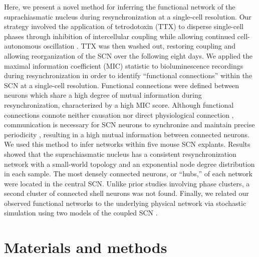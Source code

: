 Here, we present a novel method for inferring the functional network of the suprachiasmatic nucleus during resynchronization at a single-cell resolution.
Our strategy involved the application of tetrodotoxin (TTX) to disperse single-cell phases through inhibition of intercellular coupling while allowing continued cell-autonomous oscillation \cite{Yamaguchi2003, Schwartz1987}. 
TTX was then washed out, restoring coupling and allowing reorganization of the SCN over the following eight days.  
We applied the maximal information coefficient (MIC) statistic \cite{Reshef2011} to bioluminescence recordings during resynchronization in order to identify ``functional connections'' within the SCN at a single-cell resolution.
Functional connections were defined between neurons which share a high degree of mutual information during resynchronization, characterized by a high MIC score.
Although functional connections connote neither causation nor direct physiological connection \cite{Eguiluz2005}, communication is necessary for SCN neurons to synchronize and maintain precise periodicity \cite{Herzog2004a}, resulting in a high mutual information between connected neurons.
We used this method to infer networks within five mouse SCN explants. 
Results showed that the suprachiasmatic nucleus has a consistent resynchronization network with a small-world topology and an exponential node degree distribution in each sample. 
The most densely connected neurons, or ``hubs,'' of each network were located in the central SCN.
Unlike prior studies involving phase clusters, a second cluster of connected shell neurons was not found.
Finally, we related our observed functional networks to the underlying physical network via stochastic simulation using two models of the coupled SCN \cite{Gonze2006,Schroder2012, Abel2015a}.

\section{Materials and methods}
